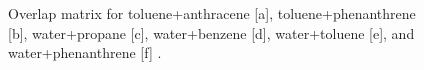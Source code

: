 \documentclass[
	12pt,				%
	openany,			%
	oneside,			%
	a4paper,			%
	english,			%
	brazil				%
	]{abntex2}
\begin{document}
\begin{apendicesenv}
\begin{figure}
	\caption{Overlap matrix for toluene+anthracene [a], toluene+phenanthrene [b], water+propane [c],  water+benzene [d], water+toluene [e], and water+phenanthrene [f] .}%
	\label{fig:over2}%
\end{figure}


\end{apendicesenv}
\end{document}
